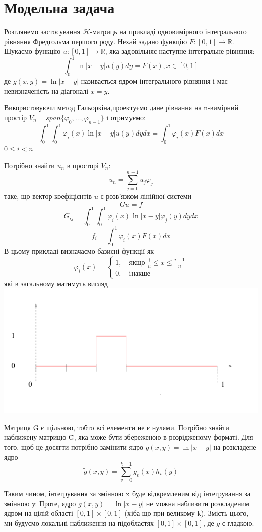 \documentclass[12pt]{report}
\begin{document}
	\section{Модельна задача}
	\hspace{0.8cm}Розглянемо застосування {$\mathcal{H}$}-матриць на прикладі одновимірного інтегрального рівняння Фредгольма першого роду. Нехай задано функцію $F:[0,1]\rightarrow \mathbb{R}$. Шукаємо функцію $u:[0,1]\rightarrow \mathbb{R}$, яка задовільняє наступне інтегральне рівняння: $$\int_{0}^{1}\ln|x-y|u(y)dy=F(x), x\in[0,1]$$
	де $g(x,y)=\ln|x-y|$ називається ядром інтегрального рівняння і має невизначеність на діагоналі $x=y$.
	\par Використовуючи метод Гальоркіна,проектуємо дане рівнання на n-вимірний простір $V_n=span\{\varphi_0,\dots,\varphi_{n-1}\}$
	i отримуємо:
	$$\int_{0}^{1}\int_{0}^{1}\varphi_i(x)\ln|x-y|u(y)dydx=\int_{0}^{1}\varphi_i(x)F(x)dx$$
	$0\le i<n$
	\par Потрібно знайти $u_n$ в просторі $V_n$:
	$$u_n=\sum_{j=0}^{n-1}u_j\varphi_j$$
	таке, що вектор коефіцієнтів $u$ є розв'язком лінійної системи $$Gu=f$$
	$$G_{ij}=\int_{0}^{1}\int_{0}^{1}\varphi_i(x)\ln|x-y|\varphi_j(y)dydx$$
	$$f_i=\int_{0}^{1}\varphi_i(x)F(x)dx$$
	 В цьому прикладі визначаємо базисні функції як
	\newline 
	\begin{equation*}
	\varphi_i(x)=\begin{cases}
			1,\quad\text{якщо $\frac{i}{n}\le x\le \frac{i+1}{n}$}\\
			0,\quad\text{інакше}
				\end{cases}
	\end{equation*}
	\newline
	які в загальному матимуть вигляд 
	\newline
		\includegraphics{1_1}
	\par Матриця G є щільною, тобто всі елементи не є нулями. Потрібно знайти наближену матрицю \~G, яка може бути збереженою в розрідженому форматі. Для того, щоб це досягти потрібно замінити ядро $g(x,y)=\ln|x-y|$ на розкладене ядро $$\tilde{g}(x,y)=\sum_{v=0}^{k-1}g_v(x)h_v(y)$$
	\par Таким чином, інтегрування за змінною x буде відкремленим від інтегрування за змінною y. Проте, ядро  $g(x,y)=\ln|x-y|$ не можна наблизити розкладеним ядром на цілій області $[0,1]\times[0,1]$ (хіба що при великому k). Змість цього, ми будуємо локальні наближення на підобластях $[0,1]\times[0,1]$, де $g$ є гладкою.
\end{document}
